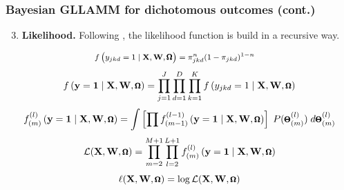 \documentclass[arial,12pt,xcolor=dvipsnames]{beamer}
\begin{document}
\begin{frame}
	\frametitle{Bayesian GLLAMM for dichotomous outcomes (cont.)}
	\begin{enumerate}
		\setcounter{enumi}{2}
		\item \textbf{Likelihood.}
		Following \citet{Rabe_et_al_2004a}, the likelihood function is build in a recursive way. 
	\end{enumerate}
	\vspace{0.3cm} \begin{equation} \label{eq:dist}
		\footnotesize
		\begin{split}
			f \left( y_{jkd}=1 \; | \; \mathbf{X}, \mathbf{W}, \pmb{\Omega} \right) &= \pi_{jkd}^{n} (1 - \pi_{jkd})^{1-n}
		\end{split}
	\end{equation}
	\begin{equation} \label{eq:lik1}
		\footnotesize
		f \left( \mathbf{y}=\mathbf{1} \; | \; \mathbf{X}, \mathbf{W}, \pmb{\Omega} \right) = \prod_{j=1}^{J} \prod_{d=1}^{D} \prod_{k=1}^{K} f \left( y_{jkd}=1 \; | \; \mathbf{X}, \mathbf{W}, \pmb{\Omega} \right)
	\end{equation}
	\begin{equation} \label{eq:lik2}
		\footnotesize
		f^{(l)}_{(m)} \left( \mathbf{y}=\mathbf{1} \; | \; \mathbf{X}, \mathbf{W}, \pmb{\Omega} \right) = \int \left[ \prod f^{(l-1)}_{(m-1)} \left( \mathbf{y}=\mathbf{1} \; | \; \mathbf{X}, \mathbf{W}, \pmb{\Omega} \right) \right] \; P( \pmb{\Theta}^{(l)}_{(m)} ) \; d\pmb{\Theta}^{(l)}_{(m)}
	\end{equation}
	\begin{equation} \label{eq:lik3}
		\footnotesize
		\mathcal{L}(\mathbf{X}, \mathbf{W}, \pmb{\Omega}) = \prod_{m=2}^{M+1} \prod_{l=2}^{L+1} f^{(l)}_{(m)} \left( \mathbf{y}=\mathbf{1} \; | \; \mathbf{X}, \mathbf{W}, \pmb{\Omega} \right)
	\end{equation}
	\begin{equation} \label{eq:loglik}
		\footnotesize
		\ell(\mathbf{X}, \mathbf{W}, \pmb{\Omega}) = \log \mathcal{L}(\mathbf{X}, \mathbf{W}, \pmb{\Omega})
	\end{equation}
\end{frame}
%
\end{document}

